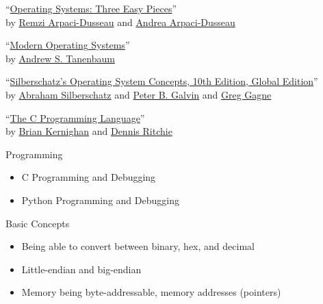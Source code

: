 \begin{slide}
  

    ``\href{https://pages.cs.wisc.edu/~remzi/OSTEP/}
           {Operating Systems: Three Easy Pieces}'' \\
    by \href{http://www.cs.wisc.edu/~remzi/}{Remzi Arpaci-Dusseau}
    and \href{http://www.cs.wisc.edu/~dusseau/}{Andrea Arpaci-Dusseau}
    \bigskip
	
	``\href{https://en.wikipedia.org/wiki/Modern_Operating_Systems}
           {Modern Operating Systems}'' \\
    by \href{https://en.wikipedia.org/wiki/Andrew_S._Tanenbaum}{Andrew S. Tanenbaum}
    \bigskip

	``\href{https://www.wiley.com/en-ie/Silberschatz's+Operating+System+Concepts%2C+Global+Edition%2C+10th+Edition-p-9781119454083}
			{Silberschatz's Operating System Concepts, 10th Edition, Global Edition}'' \\
	by \href{https://seas.yale.edu/faculty-research/faculty-directory/abraham-silberschatz}{Abraham Silberschatz} 
	and \href{https://dl.acm.org/profile/81100611528}{Peter B. Galvin}
	and \href{https://greggagne.github.io/}{Greg Gagne}
	\bigskip
    
	``\href{https://en.wikipedia.org/wiki/The_C_Programming_Language}
           {The C Programming Language}'' \\
    by \href{https://en.wikipedia.org/wiki/Brian_Kernighan}{Brian Kernighan}
    and \href{https://en.wikipedia.org/wiki/Dennis_Ritchie}{Dennis Ritchie}

\end{slide}

\begin{slide}
  

	Programming
	\begin{itemize}
		\item C Programming and Debugging
		\item Python Programming and Debugging
	\end{itemize}
	
	\bigskip

	Basic Concepts
	\begin{itemize}
		\item Being able to convert between binary, hex, and decimal
		\item Little-endian and big-endian
		\item Memory being byte-addressable, memory addresses (pointers)
	\end{itemize}
		
\end{slide}

